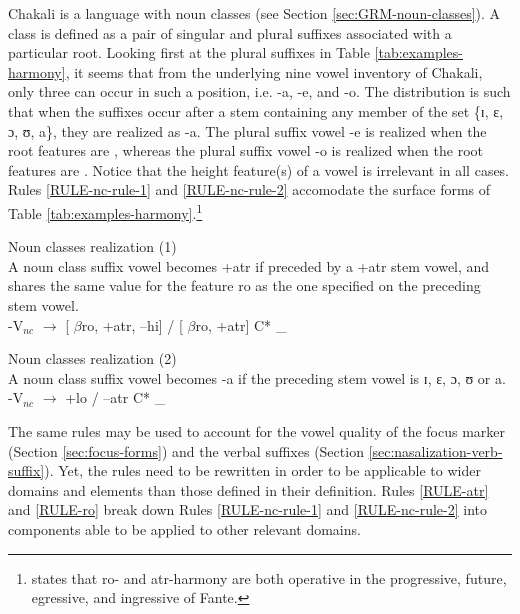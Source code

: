  Chakali is a language with
noun classes (see Section \ref{sec:GRM-noun-classes}). A class is defined as a
pair of singular and plural suffixes
associated with
a particular root.  Looking first at the plural suffixes in Table
\ref{tab:examples-harmony}, it seems that from the underlying nine vowel
inventory of Chakali, only three can occur in such a position, i.e. {\sls -a}, 
{\sls 
-e},  and {\sls -o}. The distribution is such that  when the suffixes occur 
after a
stem containing any member of the set \{ɪ, ɛ, ɔ, ʊ, a\},  they are realized as
{\sls -a}.  The plural suffix vowel {\sls -e} is realized when the root 
features 
are
{\sc [+atr, --ro]}, whereas the plural suffix vowel {\sls -o} is realized when 
the
root features are {\sc [+atr, +ro]}.  Notice that the height feature(s) of a
vowel is irrelevant in all cases.  Rules \ref{RULE-nc-rule-1} and
\ref{RULE-nc-rule-2} accomodate the surface forms of Table
\ref{tab:examples-harmony}.\footnote{\citet[19, 32--33]{Okee03} states that {\sc
ro}- and {\sc atr}-harmony are both operative in the progressive, future,
egressive, and ingressive of Fante.}


\begin{Rule}\label{RULE-nc-rule-1}{\rm Noun classes realization (1)}\\
A noun class suffix vowel becomes {\sc +atr} if preceded by a {\sc +atr}
stem vowel, and shares the same value for the
feature {\sc ro}  as the one specified on the preceding stem vowel. \\
-V$_{nc}$  $\rightarrow$ [ $\beta${\sc ro},  {\sc +atr},  {\sc --hi}] 
 / [ 
$\beta${\sc ro},
{\sc +atr}] C* \_

\end{Rule}


\begin{Rule}\label{RULE-nc-rule-2}{\rm Noun classes realization (2)}\\
A noun class suffix vowel becomes {\sls -a} if the preceding stem vowel is 
{\sls ɪ},
{\sls ɛ}, {\sls ɔ}, {\sls ʊ} or {\sls a}.\\
-V$_{nc}$ $\rightarrow$ {\sc +lo}  / {\sc --atr} C* \_ 
\end{Rule}


The same rules may be used to account for the vowel
quality of the focus marker (Section \ref{sec:focus-forms}) and  the verbal
suffixes (Section \ref{sec:nasalization-verb-suffix}). Yet, the rules need to
be rewritten in order to be  applicable to wider domains and elements than
those defined in their definition. Rules \ref{RULE-atr} and \ref{RULE-ro} break
down Rules \ref{RULE-nc-rule-1} and \ref{RULE-nc-rule-2} into components able to
be applied to other relevant domains.



